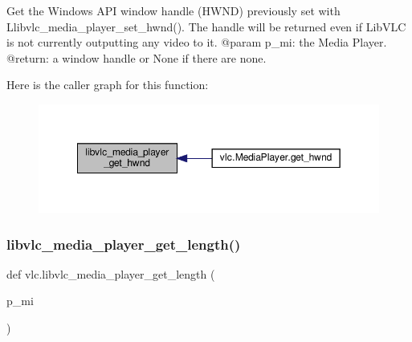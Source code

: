 \begin{DoxyVerb}Get the Windows API window handle (HWND) previously set with
L{libvlc_media_player_set_hwnd}(). The handle will be returned even if LibVLC
is not currently outputting any video to it.
@param p_mi: the Media Player.
@return: a window handle or None if there are none.
\end{DoxyVerb}
 Here is the caller graph for this function\+:
\nopagebreak
\begin{figure}[H]
\begin{center}
\leavevmode
\includegraphics[width=349pt]{namespacevlc_a30619d7bd21f38cf0e01306c37635269_icgraph}
\end{center}
\end{figure}
\mbox{\label{namespacevlc_a203cb0f1728c244d74defe39fabf686d}} 
\subsubsection{\texorpdfstring{libvlc\+\_\+media\+\_\+player\+\_\+get\+\_\+length()}{libvlc\_media\_player\_get\_length()}}
{\footnotesize\ttfamily def vlc.\+libvlc\+\_\+media\+\_\+player\+\_\+get\+\_\+length (\begin{DoxyParamCaption}\item[{}]{p\+\_\+mi }\end{DoxyParamCaption})}

